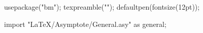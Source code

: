 \usepackage[inline]{asymptote}


\makeatletter
\newcommand{\asycode}[2][]{%
    \stepcounter{asy}%
    \setkeys{ASYkeys}{#1}%
    \ifASYattach
    \ASYinlinefalse
    \fi
    \ifx\asydir\empty\else
    \def\ASYprefix{\asydir/}%
    \fi
    \immediate\write\AsyPreStream{%
        \noexpand\InputIfFileExists{%
            \ASYprefix\noexpand\jobname-\the\c@asy.pre}{}{}%
    }
    \asy@write@graphic@header
    \immediate\write\AsyStream{\detokenize{#2}}%
    \asy@finalise@stream
    \asy@input@graphic
}
\makeatother
\newcommand{\ASYinput}[1]{%
    \asycode{include #1;}
}
\newcommand{\ASYinputx}[1]{%

}

\begin{asydef}

usepackage("bm");
texpreamble("\def\V#1{\bm{#1}}");
defaultpen(fontsize(12pt));

import "LaTeX/Asymptote/General.asy" as general;


\end{asydef}

